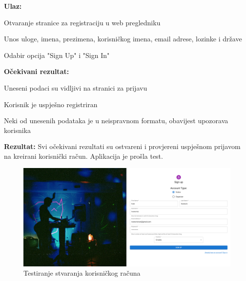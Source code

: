 			\noindent {}
			\begin{packed_item}

				\item  \textbf{Ulaz:}
				\item[] \begin{packed_enum}

					\item Otvaranje stranice za registraciju u web pregledniku
					\item Unos uloge, imena, prezimena, korisničkog imena, email adrese, lozinke i države
					\item Odabir opcija "Sign Up" i "Sign In"

				\end{packed_enum}
				
				\item  \textbf{Očekivani rezultat:}
				\item[] \begin{packed_item}
				\item[1] Uneseni podaci su vidljivi na stranici za prijavu
				\item[2.a] Korisnik je uspješno registriran
				\item[2.b] Neki od unesenih podataka je u neispravnom formatu, obavijest upozorava korisnika
				\end{packed_item}

				\item  \textbf{Rezultat:} Svi očekivani rezultati su ostvareni i provjereni uspješnom prijavom na kreirani korisnički račun. Aplikacija je prošla test.

				\begin{figure}[htbp]
					\centering
					\includegraphics[width=1\textwidth]{slike/selenium_test_1.png}
					\caption{Testiranje stvaranja korisničkog računa}
				\label{fig:my_image}
				\end{figure}
			\end{packed_item}

